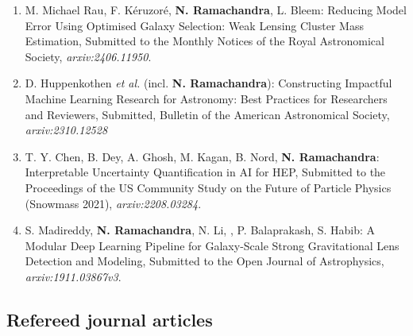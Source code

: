 \documentclass[letterpaper]{article}
\begin{document}
\begin{enumerate}
\item M. Michael Rau, F. Kéruzoré, \textbf{N. Ramachandra}, L. Bleem: Reducing Model Error Using Optimised Galaxy Selection: Weak Lensing Cluster Mass Estimation, Submitted to the Monthly Notices of the Royal Astronomical Society, {\it arxiv:2406.11950}.



\item D. Huppenkothen {\it et al.} (incl. \textbf{N. Ramachandra}): Constructing Impactful Machine Learning Research for Astronomy: Best Practices for Researchers and Reviewers, Submitted, Bulletin of the American Astronomical Society, {\it arxiv:2310.12528}
 




\item T. Y. Chen, B. Dey, A. Ghosh, M. Kagan, B. Nord, \textbf{N. Ramachandra}: Interpretable Uncertainty Quantification in AI for HEP, Submitted to the Proceedings of the US Community Study on the Future of Particle Physics (Snowmass 2021), {\it arxiv:2208.03284}. 


\item S. Madireddy, \textbf{N. Ramachandra}, N. Li, , P. Balaprakash, S. Habib: A Modular Deep Learning Pipeline for Galaxy-Scale Strong Gravitational Lens Detection and Modeling, Submitted to the Open Journal of Astrophysics, {\it arxiv:1911.03867v3}.



\end{enumerate}

\subsection*{Refereed journal articles}
\end{document}
